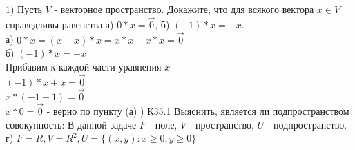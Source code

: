 \documentclass[12pt, a4paper]{article}
\begin{document}
	1) Пусть $V$ - векторное пространство. Докажите, что для всякого вектора $x \in V$ справедливы равенства а) $0 * x = \vec{0}$, б) $(-1) * x = -x$. \\

	а) $0 * x = (x - x) * x = x * x - x * x = \vec{0}$ \\
	
	б) $(-1) * x = -x$ \\
	
	Прибавим к каждой части уравнения $x$ \\
	
	$(-1) * x + x = \vec{0}$ \\
	
	$x * (-1 + 1) = \vec{0}$ \\
	
	$x * 0 = \vec{0}$ - верно по пункту (а) ) К35.1 Выяснить, является ли подпространством совокупность: \sspace
	В данной задаче $F$ - поле, $V$ - пространство, $U$ - подпространство. \\
	
	г) $F = R, V = R^2, U = \{(x, y): x \geq 0, y \geq 0\}$
	
	
\end{document}
